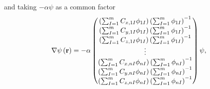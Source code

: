 and taking $-\alpha \psi$ as a common factor
\begin{equation}
    \nabla
    \psi \left( \boldsymbol{\mathrm{r}} \right)
    =
    -\alpha
    \begin{pmatrix}
        \left( 
            \sum_{I=1}^{m} 
            C_{x,1I}
            \phi_{1I} 
        \right)
        \left( 
            \sum_{I=1}^{m} \phi_{1I}
        \right)^{-1}
        \\
        \left( 
            \sum_{I=1}^{m} 
            C_{y,1I}
            \phi_{1I} 
        \right)
        \left( 
            \sum_{I=1}^{m} \phi_{1I}
        \right)^{-1}
        \\
        \left( 
            \sum_{I=1}^{m} 
            C_{z,1I}
            \phi_{1I} 
        \right)
        \left( 
            \sum_{I=1}^{m} \phi_{1I}
        \right)^{-1}
        \\
        \vdots \\
        \left( 
            \sum_{I=1}^{m} 
            C_{x,nI}
            \phi_{nI} 
        \right)
        \left( 
            \sum_{I=1}^{m} \phi_{nI}
        \right)^{-1}
        \\
        \left( 
            \sum_{I=1}^{m} 
            C_{y,nI}
            \phi_{nI} 
        \right)
        \left( 
            \sum_{I=1}^{m} \phi_{nI}
        \right)^{-1}
        \\
        \left( 
            \sum_{I=1}^{m} 
            C_{z,nI}
            \phi_{nI} 
        \right)
        \left( 
            \sum_{I=1}^{m} \phi_{nI}
        \right)^{-1}
    \end{pmatrix}
    \psi
    ,
\end{equation}

